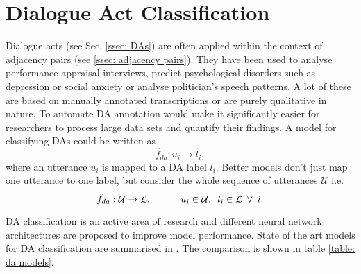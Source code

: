 \section{Dialogue Act Classification \label{ssec: da classification}}
    Dialogue acts (see Sec. \ref{ssec: DAs}) are often applied within the context of adjacency pairs (see \ref{ssec: adjacency pairs}). They have been used to analyse performance appraisal interviews\cite{ap_interview}, predict psychological disorders such as depression or social anxiety\cite{ap_psychological} or analyse politician's speech patterns\cite{ap_trump}.
    A lot of these are based on manually annotated transcriptions or are purely qualitative in nature. To automate DA annotation would make it significantly easier for researchers to process large data sets and quantify their findings. A model for classifying DAs could be written as 
    \begin{equation}
        \hat{f}_{da}: u_i \rightarrow l_i,
    \end{equation}
    where an utterance $u_i$ is mapped to a DA label $l_i$. Better models don't just map one utterance to one label, but consider the whole sequence of utterances $\mathcal{U}$ i.e.
    \begin{equation}
        \hat{f}_{da}: \mathcal{U} \rightarrow \mathcal{L}, \hspace{3em} u_i \in \mathcal{U}, \hspace{0.5em} l_i \in \mathcal{L} \hspace{0.5em} \forall \hspace{0.5em} i.
    \end{equation}
    
    DA classification is an active area of research and different neural network architectures are proposed to improve model performance. State of the art models for DA classification are summarised in \cite{DAgithub}. The comparison is shown in table \ref{table: da models}.
    
